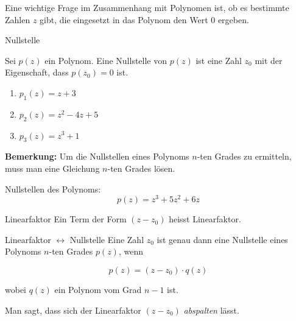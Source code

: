Eine wichtige Frage im Zusammenhang mit Polynomen ist, ob es bestimmte Zahlen \( z \) gibt, die eingesetzt in das Polynom den Wert 0 ergeben.
\begin{definition}
    {Nullstelle}{}

    Sei \( p(z) \) ein Polynom. Eine Nullstelle von \( p(z) \) ist eine Zahl \( z_0 \) mit der Eigenschaft, dass \( p(z_0) = 0 \) ist.

\end{definition}

\begin{bsp}
    {}{}
    \begin{enumerate}
        \item $
p_1(z) = z + 3
$
\vspace{2cm}

\item $
p_2(z) = z^2 - 4z + 5
$
\vspace{3cm}
\item $
p_3(z) = z^3 + 1$
\vspace{3cm}

    \end{enumerate}
\end{bsp}
\textbf{Bemerkung:} Um die Nullstellen eines Polynoms $n$-ten Grades zu ermitteln, muss man eine Gleichung $n$-ten Grades lösen.

\begin{bsp}
    {}{}
    Nullstellen des Polynoms:
\[
p(z) = z^3 + 5z^2 + 6z
\]

\vspace*{3cm}
\end{bsp}




\begin{definition}
    {Linearfaktor}{}
    Ein Term der Form $(z-z_0)$ heisst Linearfaktor.

\end{definition}
\begin{satz}
    {Linearfaktor $\leftrightarrow$ Nullstelle}{}
    Eine Zahl $z_0$ ist genau dann eine Nullstelle eines Polynoms $n$-ten Grades $p(z)$, wenn 

\[
p(z) = (z - z_0) \cdot q(z)
\]

wobei $q(z)$ ein Polynom vom Grad $n-1$ ist.

Man sagt, dass sich der Linearfaktor $(z - z_0)$ \emph{abspalten} lässt.
\end{satz}

